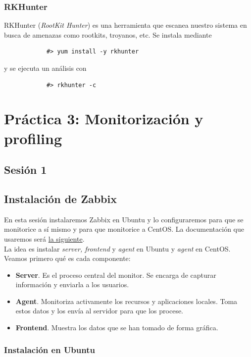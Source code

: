 \documentclass[12pt,spanish]{article}
\begin{document}
  \subsubsection{RKHunter}

  RKHunter (\textit{RootKit Hunter}) es una herramienta que escanea nuestro sistema en busca de amenazas como rootkits, troyanos, etc. Se instala mediante
  \begin{lstlisting}
            #> yum install -y rkhunter
  \end{lstlisting}
y se ejecuta un análisis con
\begin{lstlisting}
            #> rkhunter -c
\end{lstlisting}



\section{Práctica 3: Monitorización y profiling}

\subsection{Sesión 1}

\subsection{Instalación de Zabbix}
En esta sesión instalaremos Zabbix en Ubuntu y lo configuraremos para que se monitorice a sí mismo y para que monitorice a CentOS. La documentación que usaremos será \href{https://www.zabbix.com/documentation/3.4/manual}{la siguiente}.\\

La idea es instalar \textit{server, frontend} y \textit{agent} en Ubuntu y \textit{agent} en CentOS. Veamos primero qué es cada componente:

\begin{itemize}
  \item \textbf{Server}. Es el proceso central del monitor. Se encarga de capturar información y enviarla a los usuarios.
  \item \textbf{Agent}. Monitoriza activamente los recursos y aplicaciones locales. Toma estos datos y los envía al servidor para que los procese.
  \item \textbf{Frontend}. Muestra los datos que se han tomado de forma gráfica.
\end{itemize}

\subsubsection{Instalación en Ubuntu}
\end{document}
